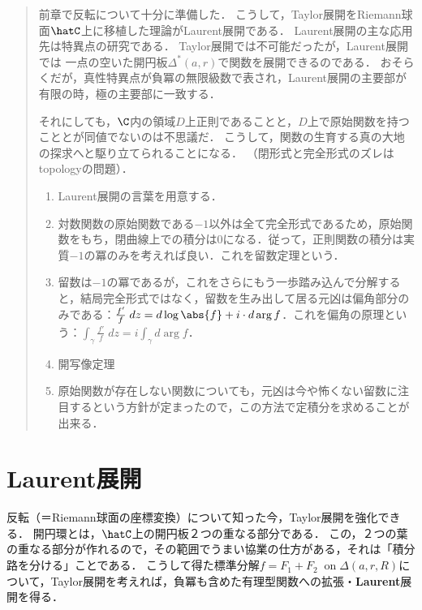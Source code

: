 \documentclass[uplatex, dvipdfmx]{jsreport}
\begin{document}
\begin{quotation}
    前章で反転について十分に準備した．
    こうして，Taylor展開をRiemann球面$\hatC$上に移植した理論がLaurent展開である．
    Laurent展開の主な応用先は特異点の研究である．
    Taylor展開では不可能だったが，Laurent展開では
    一点の空いた開円板$\Delta^*(a,r)$で関数を展開できるのである．
    おそらくだが，真性特異点が負冪の無限級数で表され，Laurent展開の主要部が有限の時，極の主要部に一致する．

    それにしても，$\C$内の領域$D$上正則であることと，$D$上で原始関数を持つこととが同値でないのは不思議だ．
    こうして，関数の生育する真の大地の探求へと駆り立てられることになる．
    （閉形式と完全形式のズレはtopologyの問題）．

    \begin{enumerate}
        \item Laurent展開の言葉を用意する．
        \item 対数関数の原始関数である$-1$以外は全て完全形式であるため，原始関数をもち，閉曲線上での積分は$0$になる．従って，正則関数の積分は実質$-1$の冪のみを考えれば良い．これを留数定理という．
        \item 留数は$-1$の冪であるが，これをさらにもう一歩踏み込んで分解すると，結局完全形式ではなく，留数を生み出して居る元凶は偏角部分のみである：$\frac{f'}{f}\;dz=d\log\abs{f}+i\cdot d\arg f$．これを偏角の原理という：$\int_\gamma\frac{f'}{f}\;dz=i\int_\gamma d\arg f$．
        \item 開写像定理
        \item 原始関数が存在しない関数についても，元凶は今や怖くない留数に注目するという方針が定まったので，この方法で定積分を求めることが出来る．
    \end{enumerate}
\end{quotation}

\section{Laurent展開}

\begin{screen}
    反転（＝Riemann球面の座標変換）について知った今，Taylor展開を強化できる．
    開円環とは，$\hatC$上の開円板２つの重なる部分である．
    この，２つの葉の重なる部分が作れるので，その範囲でうまい協業の仕方がある，それは「積分路を分ける」ことである．
    こうして得た標準分解$f=F_1+F_2\;\;\mathrm{on}\;\Delta(a,r,R)$について，Taylor展開を考えれば，負冪も含めた有理型関数への拡張・\textbf{Laurent}展開を得る．
\end{screen}
\end{document}
